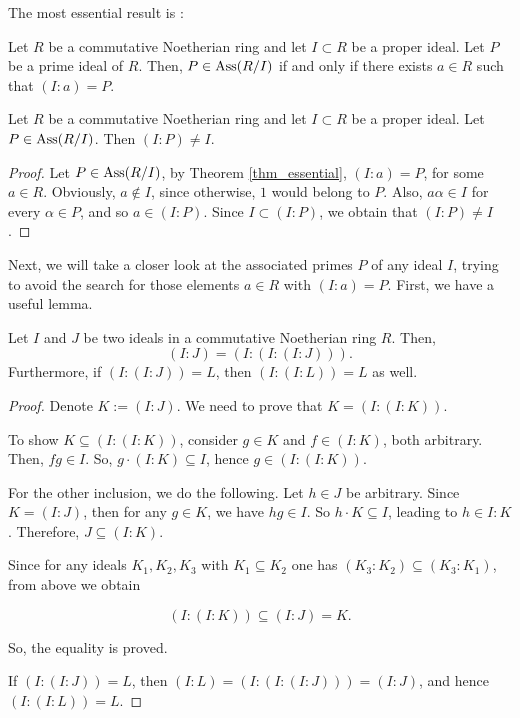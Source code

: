 \documentclass[11pt]{amsart}   %
\begin{document}
The most essential result is \cite[Proposition 8.22]{Sh}:

\begin{thm}\label{thm_essential} Let $R$ be a commutative Noetherian ring and let $I\subset R$ be a proper ideal. Let $P$ be a prime ideal of $R$. Then, $P\in{\rm Ass}(R/I)$ if and only if there exists $a\in R$ such that $(I:a)=P$.
\end{thm}

\begin{cor}\label{cor_useful} Let $R$ be a commutative Noetherian ring and let $I\subset R$ be a proper ideal. Let $P\in{\rm Ass}(R/I)$. Then $(I:P)\neq I$.
\end{cor}
\begin{proof} Let $P\in{\rm Ass}(R/I)$, by Theorem \ref{thm_essential}, $(I:a)=P$, for some $a\in R$. Obviously, $a\notin I$, since otherwise, $1$ would belong to $P$. Also, $a\alpha\in I$ for every $\alpha\in P$, and so $a\in (I:P)$. Since $I\subset (I:P)$, we obtain that $(I:P)\neq I$.
\end{proof}

Next, we will take a closer look at the associated primes $P$ of any ideal $I$, trying to avoid the search for those elements $a\in R$ with $(I:a)=P$. First, we have a useful lemma.

\begin{lem}\label{lem_colon} Let $I$ and $J$ be two ideals in a commutative Noetherian ring $R$. Then,
$$(I:J)=(I:(I:(I:J))).$$ Furthermore, if $(I:(I:J))=L$, then $(I:(I:L))=L$ as well.
\end{lem}
\begin{proof} Denote $K:=(I:J)$. We need to prove that $K=(I:(I:K))$.

To show $K\subseteq (I:(I:K))$, consider $g\in K$ and $f\in (I:K)$, both arbitrary. Then, $fg\in I$. So, $g\cdot(I:K)\subseteq I$, hence $g\in (I:(I:K))$.

For the other inclusion, we do the following. Let $h\in J$ be arbitrary. Since $K=(I:J)$, then for any $g\in K$, we have $hg\in I$. So $h\cdot K\subseteq I$, leading to $h\in I:K$. Therefore, $J\subseteq (I:K)$.

Since for any ideals $K_1,K_2,K_3$ with $K_1\subseteq K_2$ one has $(K_3:K_2)\subseteq (K_3:K_1)$, from above we obtain

$$(I:(I:K))\subseteq (I:J)=K.$$

So, the equality is proved.

\medskip

If $(I:(I:J))=L$, then $(I:L)=(I:(I:(I:J)))=(I:J)$, and hence $(I:(I:L))=L$.
\end{proof}
\end{document}
